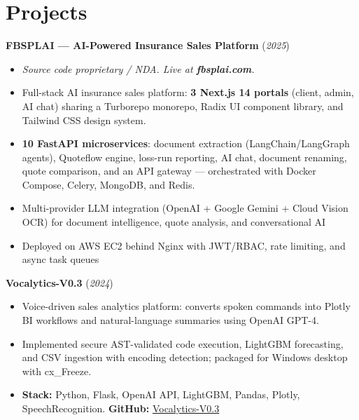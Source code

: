 \documentclass[10pt,letterpaper]{article}
\newcommand{\projheader}[2]{%
  \textbf{#1} (\textit{#2})
  \vspace{0.02cm}
}
\begin{document}
\vspace{0.05cm}

\section{Projects}

\projheader{FBSPLAI --- AI-Powered Insurance Sales Platform}{2025}
\begin{itemize}
  \item \textit{Source code proprietary / NDA. Live at \textbf{fbsplai.com}.}
  \item Full-stack AI insurance sales platform: \textbf{3 Next.js 14 portals} (client, admin, AI chat)
  sharing a Turborepo monorepo, Radix UI component library, and Tailwind CSS design system.
  \item \textbf{10 FastAPI microservices}: document extraction (LangChain/LangGraph agents),
  Quoteflow engine, loss-run reporting, AI chat, document renaming, quote comparison, and an API
  gateway --- orchestrated with Docker Compose, Celery, MongoDB, and Redis.
  \item Multi-provider LLM integration (OpenAI + Google Gemini + Cloud Vision OCR)
  for document intelligence, quote analysis, and conversational AI
  \item Deployed on AWS EC2 behind Nginx with JWT/RBAC, rate limiting, and async task queues
\end{itemize}

\vspace{0.08cm}

\projheader{Vocalytics-V0.3}{2024}
\begin{itemize}
  \item Voice-driven sales analytics platform: converts spoken commands into Plotly BI workflows
  and natural-language summaries using OpenAI GPT-4.
  \item Implemented secure AST-validated code execution, LightGBM forecasting, and CSV ingestion
  with encoding detection; packaged for Windows desktop with cx\_Freeze.
  \item \textbf{Stack:} Python, Flask, OpenAI API, LightGBM, Pandas, Plotly, SpeechRecognition.
  \quad \textbf{GitHub:} \href{https://github.com/Mizan-muf/Vocalytics-V0.3}{Vocalytics-V0.3}
\end{itemize}

\vspace{0.08cm}
\end{document}
